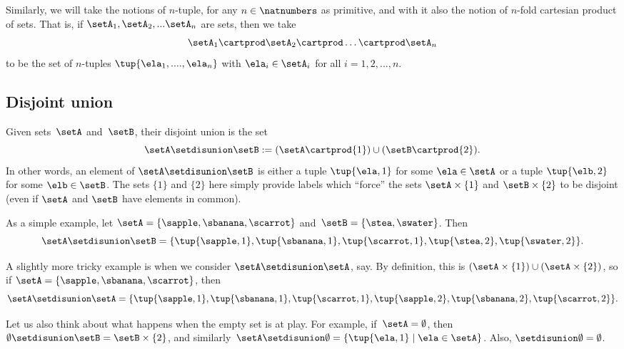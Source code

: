 Similarly, we will take the notions of $n$-tuple, for any $n \in \natnumbers$ as primitive, and with it also the notion of $n$-fold cartesian product of sets.
That is, if $\setA_1, \setA_2, .
    .. \setA_n$ are sets, then we take
\begin{equation}
    \setA_1 \cartprod \setA_2 \cartprod \dots \cartprod \setA_n
\end{equation}
to be the set of $n$-tuples $\tup{\ela_1, ...., \ela_n}$ with $\ela_i \in \setA_i$ for all $i = 1,2,...,n$.

\subsection{Disjoint union}
\label{sec:disjoint-union}

Given sets~$\setA$ and~$\setB$, their disjoint union is the set
\begin{equation*}
    \setA \setdisunion \setB := (\setA \cartprod \{ 1 \}) \cup (\setB \cartprod \{2\}).
\end{equation*}
In other words, an element of  $\setA \setdisunion \setB$ is either a tuple $\tup{\ela, 1}$ for some  $\ela \in \setA$ or a tuple $\tup{\elb, 2}$ for some $\elb \in \setB$.
The sets $\{ 1 \}$ and $\{2\}$ here simply provide labels which ``force'' the sets $\setA \times \{ 1 \}$ and $\setB \times \{2\}$ to be disjoint (even if $\setA$ and $\setB$ have elements in common).

As a simple example, let $\setA = \{ \sapple, \sbanana, \scarrot\}$ and~$\setB = \{ \stea, \swater \}$.
Then
\begin{equation*}
    \setA \setdisunion \setB = \{ \tup{\sapple, 1}, \tup{\sbanana, 1}, \tup{\scarrot, 1}, \tup{\stea, 2},  \tup{\swater, 2}\}.
\end{equation*}

A slightly more tricky example is when we consider $\setA \setdisunion \setA$, say.
By definition, this is $(\setA \times \{ 1 \}) \cup (\setA \times \{2\})$, so if $\setA = \{ \sapple, \sbanana, \scarrot\}$, then
\begin{equation*}
    \setA \setdisunion \setA = \{ \tup{\sapple, 1}, \tup{\sbanana, 1}, \tup{\scarrot, 1}, \tup{\sapple, 2}, \tup{\sbanana, 2}, \tup{\scarrot, 2} \}.
\end{equation*}

Let us also think about what happens when the empty set is at play.
For example, if~$\setA = \emptyset$, then~$\emptyset \setdisunion \setB = \setB \times \{2\}$, and similarly~$\setA \setdisunion \emptyset =  \{ \tup{\ela,1} \mid \ela \in \setA \}$.
Also, $\empty \setdisunion \emptyset = \emptyset$.

